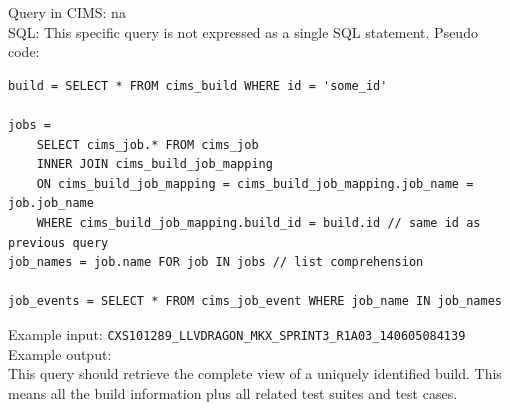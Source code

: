 

\label{q:getallbuilddata}
Query in CIMS: na \\
SQL: This specific query is not expressed as a single SQL statement. Pseudo code:
\begin{verbatim}
build = SELECT * FROM cims_build WHERE id = 'some_id'

jobs = 
    SELECT cims_job.* FROM cims_job
    INNER JOIN cims_build_job_mapping
    ON cims_build_job_mapping = cims_build_job_mapping.job_name = job.job_name
    WHERE cims_build_job_mapping.build_id = build.id // same id as previous query
job_names = job.name FOR job IN jobs // list comprehension

job_events = SELECT * FROM cims_job_event WHERE job_name IN job_names
\end{verbatim}
Example input: {\tt CXS101289\_LLVDRAGON\_MKX\_SPRINT3\_R1A03\_140605084139 } \\
Example output: \\
This query should retrieve the complete view of a uniquely identified build. This means all the build information plus all related test suites and test cases.


%
%
